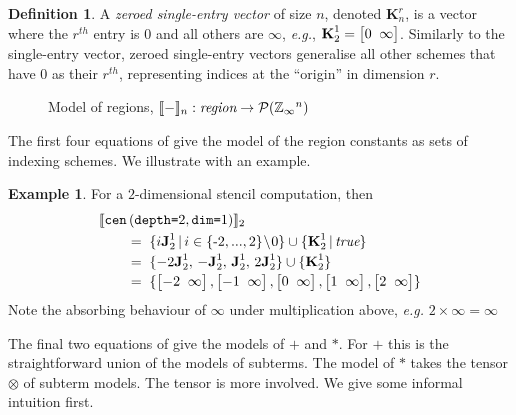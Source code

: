 \documentclass[10pt,preprint]{sigplanconf}
\newcounter{block}
\theoremstyle{definition}
\newtheorem{example}[block]{Example}
\newtheorem{definition}[block]{Definition}
\newcommand{\eg}{\emph{e.g.}}
\newcommand{\interp}[1]{\llbracket{#1}\rrbracket}
\newcommand{\term}[1]{\texttt{#1}}
\newcommand{\stenCenS}[2]{\term{cen} \, (\term{depth=}#1,
  \term{dim=}#2)}
\newcommand{\vtwoh}[2]{\setlength{\arraycolsep}{0em}
\left[\begin{array}{cc}#1 \; & \; #2\end{array}\right]}
\newcommand{\singleEntry}[2]{\textbf{J}_{#2}^{#1}}
\newcommand{\zeroEntry}[2]{\textbf{K}_{#2}^{#1}}
\begin{document}
\begin{definition}
A \emph{zeroed single-entry vector} of size $n$, denoted
$\zeroEntry{r}{n}$, is a vector where the $r^{th}$ entry is $0$ and all others
are $\infty$, \eg{}, $\zeroEntry{1}{2} = \vtwoh{0}{\infty}$.
Similarly to the single-entry vector, zeroed single-entry vectors
generalise all other schemes
that have $0$ as their $r^{th}$, representing indices at
the ``origin'' in dimension $r$.
\end{definition}

\begin{figure}[t]
\vspace{-0.9em}

\caption{Model of regions,
$\interp{-}_n : \textit{region} \rightarrow \mathcal{P}(\domainVal{}^n)$}
\label{fig:region-model}
\vspace{-1em}
\end{figure}

\noindent
The first four equations of 
give the model of the region constants as sets of indexing
schemes. We illustrate with an example.

\begin{example}
For a $2$-dimensional stencil computation, then
\begin{align*}
& \interp{\stenCenS{2}{1}}_2 \\[-0.1em]
& \qquad = \; \{i\singleEntry{1}{2} \,|\, i \in \{\text{-}2,..., 2\}\!\setminus\!0 \}
  \cup  \{ \zeroEntry{1}{2} \,|\, \textit{true} \} \\[-0.2em]
& \qquad = \; \{-2\singleEntry{1}{2}, \, -\singleEntry{1}{2}, \,
  \singleEntry{1}{2}, \, 2\singleEntry{1}{2}\} \cup
  \{\zeroEntry{1}{2}\} \\[-0.2em]
& \qquad = \; \{\vtwoh{-2}{\infty}, \vtwoh{-1}{\infty}, \vtwoh{0}{\infty},
\vtwoh{1}{\infty}, \vtwoh{2}{\infty}\}
\end{align*}
Note the absorbing behaviour of $\infty$ under multiplication above, \eg{} $2
\times \infty = \infty$
\end{example}
\noindent
The final two equations of  give the models
of $\term{+}$ and $\term{*}$. For $\term{+}$ this is the
straightforward union of the models of subterms. The model of
$\term{*}$ takes the tensor $\otimes$ of subterm models. The tensor is
more involved. We give some informal intuition first.

\end{document}
